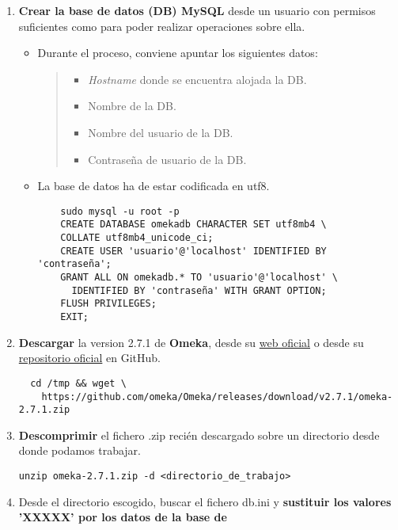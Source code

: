 \begin{enumerate}
\def\labelenumi{\arabic{enumi}.}
\tightlist
\item
  \textbf{Crear la base de datos (DB) MySQL} desde un usuario con
  permisos suficientes como para poder realizar operaciones sobre ella.
  \begin{itemize}
  \item
    Durante el proceso, conviene apuntar los siguientes datos:
    \begin{quote}
    \begin{itemize}
    \tightlist
    \item
      \emph{Hostname} donde se encuentra alojada la DB.
    \item
      Nombre de la DB.
    \item
      Nombre del usuario de la DB.
    \item
      Contraseña de usuario de la DB.
    \end{itemize}
    \end{quote}
  \item
    La base de datos ha de estar codificada en {utf8}.
    \begin{verbatim}
 	sudo mysql -u root -p
   	CREATE DATABASE omekadb CHARACTER SET utf8mb4 \
   	COLLATE utf8mb4_unicode_ci;
   	CREATE USER 'usuario'@'localhost' IDENTIFIED BY 'contraseña';
   	GRANT ALL ON omekadb.* TO 'usuario'@'localhost' \
      IDENTIFIED BY 'contraseña' WITH GRANT OPTION;
   	FLUSH PRIVILEGES;
   	EXIT;
   	\end{verbatim}
  \end{itemize}
  \item
  \textbf{Descargar} la version 2.7.1 de \textbf{Omeka}, desde su \href{https://omeka.org/classic/download/}{web oficial} o desde su \href{http://github.com/omeka/Omeka}{repositorio oficial} en
  GitHub.
  \begin{verbatim}
  cd /tmp && wget \
    https://github.com/omeka/Omeka/releases/download/v2.7.1/omeka-2.7.1.zip
  \end{verbatim}
\item
  \textbf{Descomprimir} el fichero {.zip} recién descargado sobre un
  directorio desde donde podamos trabajar.
\begin{verbatim}
unzip omeka-2.7.1.zip -d <directorio_de_trabajo>
\end{verbatim}
\item
  Desde el directorio escogido, buscar el fichero {db.ini} y
  \textbf{sustituir los valores 'XXXXX' por los datos de la base de
}
\end{enumerate}
